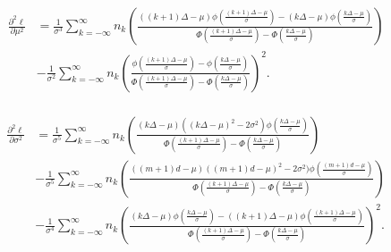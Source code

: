 \documentclass[11pt,a4,twosided,singlespacing,titlepagenumber=on,numbers=endperiod]{scrreprt}
\numberwithin{equation}{chapter} %
\theoremstyle{remark}
\begin{document}
\begin{equation}\label{eq:normal_d2_dmu}
	\begin{aligned}
		\frac{\partial^2 \ell}{\partial \mu^2} &= \frac{1}{\sigma^3} \sum_{k=-\infty}^\infty n_k \left( 
		\frac{((k + 1) \Delta - \mu) \phi \left( \frac{(k + 1) \Delta - \mu}{\sigma} \right) - (k \Delta - \mu) \phi \left( \frac{k \Delta - \mu}{\sigma} \right) }
		 {\Phi \left( \frac{(k + 1) \Delta - \mu}{\sigma} \right) - \Phi \left(\frac{k \Delta - \mu}{\sigma} \right)}
		 \right) \\
		 &- \frac{1}{\sigma^2} \sum_{k=-\infty}^\infty n_k \left(
		 \frac{\phi \left( \frac{(k + 1) \Delta - \mu}{\sigma} \right) - \phi \left( \frac{k \Delta - \mu}{\sigma} \right)}
		 {\Phi \left( \frac{(k + 1) \Delta - \mu}{\sigma} \right) - \Phi \left(\frac{k \Delta - \mu}{\sigma} \right)}
		 \right)^2. \\
	\end{aligned}
\end{equation}

\begin{equation}\label{eq:normal_d2_dsig}
	\begin{aligned}
		\frac{\partial^2 \ell}{\partial \sigma^2} &= \frac{1}{\sigma^5} \sum_{k=-\infty}^\infty n_k \left(
		\frac{(k \Delta - \mu)((k \Delta - \mu)^2 - 2 \sigma^2) \phi \left( \frac{k \Delta - \mu}{\sigma} \right)}
		 {\Phi \left( \frac{(k + 1) \Delta - \mu}{\sigma} \right) - \Phi \left(\frac{k \Delta - \mu}{\sigma} \right)}
		 \right) \\
		 &- \frac{1}{\sigma^5} \sum_{k=-\infty}^\infty n_k \left(
		 \frac{((m+1)d - \mu)((m+1)d - \mu)^2 - 2 \sigma^2) \phi \left( \frac{(m+1)d - \mu}{\sigma} \right)}
		 {\Phi \left( \frac{(k + 1) \Delta - \mu}{\sigma} \right) - \Phi \left(\frac{k \Delta - \mu}{\sigma} \right)}
		 \right) \\
		 &- \frac{1}{\sigma^4} \sum_{k=-\infty}^\infty n_k \left(
		 \frac{(k \Delta - \mu) \phi \left( \frac{k \Delta - \mu}{\sigma} \right) - ((k + 1) \Delta - \mu)\phi \left( \frac{(k + 1) \Delta - \mu}{\sigma} \right)}
		 {\Phi \left( \frac{(k + 1) \Delta - \mu}{\sigma} \right) - \Phi \left(\frac{k \Delta - \mu}{\sigma} \right)}
		 \right)^2.
	\end{aligned}
\end{equation}
\end{document}

